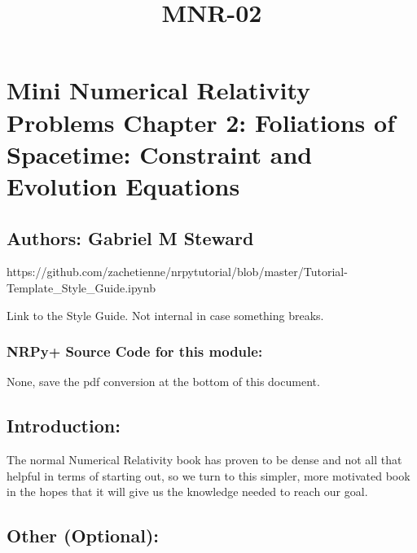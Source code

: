 \documentclass[landscape,letterpaper,10pt,english]{article}
\title{MNR-02}
\begin{document}
    
    \maketitle
    
    

    
    \hypertarget{mini-numerical-relativity-problems-chapter-2-foliations-of-spacetime-constraint-and-evolution-equations}{%
\section{Mini Numerical Relativity Problems Chapter 2: Foliations of
Spacetime: Constraint and Evolution
Equations}\label{mini-numerical-relativity-problems-chapter-2-foliations-of-spacetime-constraint-and-evolution-equations}}

\hypertarget{authors-gabriel-m-steward}{%
\subsection{Authors: Gabriel M
Steward}\label{authors-gabriel-m-steward}}

    https://github.com/zachetienne/nrpytutorial/blob/master/Tutorial-Template\_Style\_Guide.ipynb

Link to the Style Guide. Not internal in case something breaks.

    \hypertarget{nrpy-source-code-for-this-module}{%
\subsubsection{\texorpdfstring{ NRPy+ Source Code for this
module:}{ NRPy+ Source Code for this module:}}\label{nrpy-source-code-for-this-module}}

None, save the pdf conversion at the bottom of this document.

\hypertarget{introduction}{%
\subsection{Introduction:}\label{introduction}}

The normal Numerical Relativity book has proven to be dense and not all
that helpful in terms of starting out, so we turn to this simpler, more
motivated book in the hopes that it will give us the knowledge needed to
reach our goal.

\hypertarget{other-optional}{%
\subsection{\texorpdfstring{ Other
(Optional):}{ Other (Optional):}}\label{other-optional}}
\end{document}
